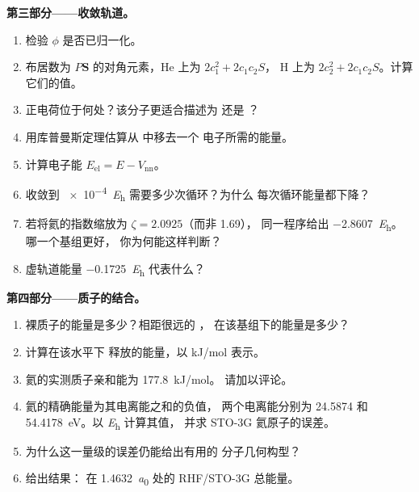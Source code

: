 \begin{problem}
\medskip\noindent\textbf{第三部分——收敛轨道。}
\begin{enumerate}[resume]
  \item 检验 $\phi$ 是否已归一化。
  \item 布居数为 $P\mathbf S$ 的对角元素，He 上为 $2c_1^2 + 2c_1c_2S$，
        H 上为 $2c_2^2 + 2c_1c_2S$。计算它们的值。
  \item 正电荷位于何处？该分子更适合描述为
         还是 ？
  \item 用库普曼斯定理估算从  中移去一个
        电子所需的能量。
  \item 计算电子能 $E_{\mathrm{el}} = E - V_{\mathrm{nn}}$。
  \item 收敛到 \qty{e-4}{\hartree} 需要多少次循环？为什么
        每次循环能量都下降？
  \item 若将氦的指数缩放为 $\zeta = 2.0925$（而非 1.69），
        同一程序给出 \qty{-2.8607}{\hartree}。哪一个基组更好，
        你为何能这样判断？
  \item 虚轨道能量 \qty{-0.1725}{\hartree} 代表什么？
\end{enumerate}

\medskip\noindent\textbf{第四部分——质子的结合。}
\begin{enumerate}[resume]
  \item 裸质子的能量是多少？相距很远的 ，
        在该基组下的能量是多少？
  \item 计算在该水平下  释放的能量，以
        \unit{kJ/mol} 表示。
  \item 氦的实测质子亲和能为 \qty{177.8}{kJ/mol}。
        请加以评论。
  \item 氦的精确能量为其电离能之和的负值，
        两个电离能分别为 24.5874 和 \qty{54.4178}{eV}。以 \unit{\hartree} 计算其值，
        并求 STO-3G 氦原子的误差。
  \item 为什么这一量级的误差仍能给出有用的
        分子几何构型？
  \item 给出结果： 在
        \qty{1.4632}{\bohr} 处的 RHF/STO-3G 总能量。
\end{enumerate}
\end{problem}
